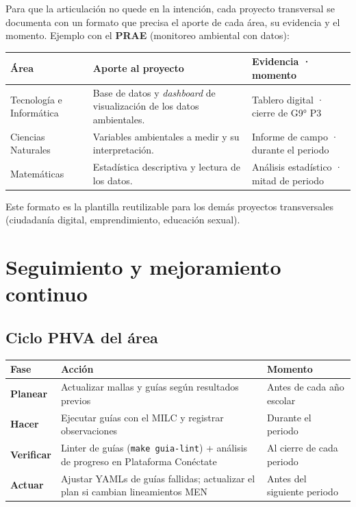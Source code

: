 \documentclass[12pt, a4paper]{article}
\begin{document}
Para que la articulación no quede en la intención, cada proyecto transversal se
documenta con un formato que precisa el aporte de cada área, su evidencia y el
momento. Ejemplo con el \textbf{PRAE} (monitoreo ambiental con datos):

\begin{center}
\footnotesize
\setlength{\tabcolsep}{4pt}
\begin{tabular}{|L{3.2cm}|L{5.5cm}|L{4.8cm}|}
\hline
{}
\color{white}\textbf{Área} &
\color{white}\textbf{Aporte al proyecto} &
\color{white}\textbf{Evidencia · momento} \\
\hline
Tecnología e Informática & Base de datos y \textit{dashboard} de visualización de los datos ambientales. & Tablero digital · cierre de G9° P3 \\
\hline
Ciencias Naturales & Variables ambientales a medir y su interpretación. & Informe de campo · durante el periodo \\
\hline
Matemáticas & Estadística descriptiva y lectura de los datos. & Análisis estadístico · mitad de periodo \\
\hline
\end{tabular}
\end{center}

\noindent Este formato es la plantilla reutilizable para los demás proyectos
transversales (ciudadanía digital, emprendimiento, educación sexual).

\section{Seguimiento y mejoramiento continuo}

\subsection{Ciclo PHVA del área}

\begin{center}
\begin{tabular}{|L{2cm}|L{5cm}|L{6.5cm}|}
\hline
{}
\color{white}\textbf{Fase} &
\color{white}\textbf{Acción} &
\color{white}\textbf{Momento} \\
\hline
\textbf{Planear} &
Actualizar mallas y guías según resultados previos &
Antes de cada año escolar \\
\hline
\textbf{Hacer} &
Ejecutar guías con el MILC y registrar observaciones &
Durante el periodo \\
\hline
\textbf{Verificar} &
Linter de guías (\texttt{make guia-lint}) + análisis de progreso en Plataforma Conéctate &
Al cierre de cada periodo \\
\hline
\textbf{Actuar} &
Ajustar YAMLs de guías fallidas; actualizar el plan si cambian lineamientos MEN &
Antes del siguiente periodo \\
\hline
\end{tabular}
\end{center}
\end{document}
